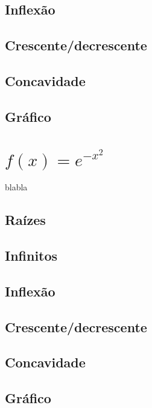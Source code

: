 \documentclass[12pt]{article}
\theoremstyle{definition}
\begin{document}
\subsection{Inflexão}
\subsection{Crescente/decrescente}
\subsection{Concavidade}
\subsection{Gráfico}

\section{\(f(x) = e^{-x^2}\)}
blabla
\subsection{Raízes}
\subsection{Infinitos}
\subsection{Inflexão}
\subsection{Crescente/decrescente}
\subsection{Concavidade}
\subsection{Gráfico}
\end{document}
